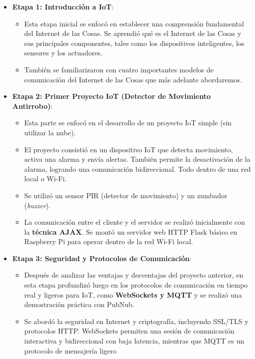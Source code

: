 \documentclass{report}
\begin{document}
\begin{itemize}
    \item \textbf{Etapa 1: Introducción a IoT}:
    \begin{itemize}
        \item Esta etapa inicial se enfocó en establecer una comprensión fundamental del Internet de las Cosas. Se aprendió qué 
        es el Internet de las Cosas y sus principales componentes, tales como los dispositivos inteligentes, los sensores y los 
        actuadores.
        \item También se familiarizaron con cuatro importantes modelos de comunicación del Internet de las Cosas que más adelante
        abordaremos.
    \end{itemize}
    \item \textbf{Etapa 2: Primer Proyecto IoT (Detector de Movimiento Antirrobo)}:
    \begin{itemize}
        \item Esta parte se enfocó en el desarrollo de un proyecto IoT simple (sin utilizar la nube).
        \item El proyecto consistió en un dispositivo IoT que detecta movimiento, 
        activa una alarma y envía alertas. También permite la desactivación de la alarma, logrando una comunicación bidireccional.
        Todo dentro de una red local o Wi-Fi.
        \item Se utilizó un sensor PIR (detector de movimiento) y un zumbador (\textit{buzzer}).
        \item La comunicación entre el cliente y el servidor se realizó inicialmente con la \textbf{técnica AJAX}. Se montó un 
        servidor web HTTP Flask básico en Raspberry Pi para operar dentro de la red Wi-Fi local.
    \end{itemize}
    \item \textbf{Etapa 3: Seguridad y Protocolos de Comunicación}:
    \begin{itemize}
        \item Después de analizar las ventajas y desventajas del proyecto anterior, en esta etapa profundizó luego en los 
        protocolos de comunicación en tiempo real y ligeros para IoT, como \textbf{WebSockets y MQTT} y se realizó una 
        demostración práctica con PubNub.
        \item Se abordó la seguridad en Internet y criptografía, incluyendo SSL/TLS y protocolos HTTP. WebSockets permiten una 
        sesión de comunicación interactiva y bidireccional con baja latencia, mientras que MQTT es un protocolo de mensajería ligero 

\end{itemize}
\end{itemize}
\end{document}

